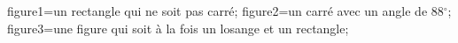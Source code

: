 \documentclass[exercice]{thedocument}%
\begin{document}
%
    \>figure1=un rectangle qui ne soit pas carré;%
    \>figure2=un carré avec un angle de 88$^\circ$;%
    \>figure3=une figure qui soit à la fois un losange et un rectangle;%
\end{document}
